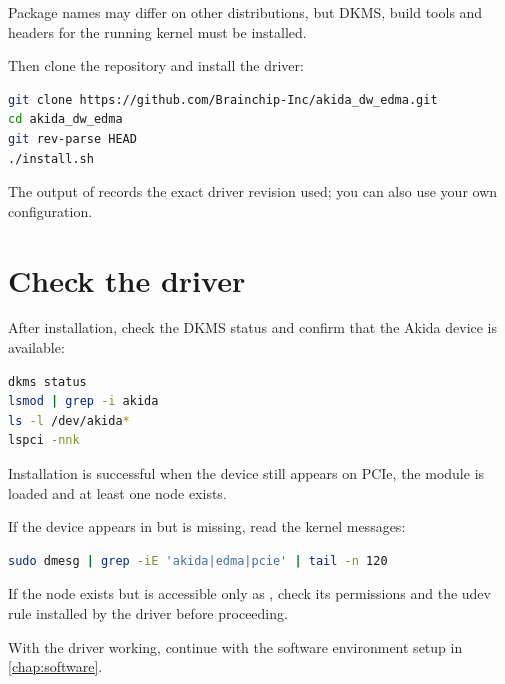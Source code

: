Package names may differ on other distributions, but DKMS, build tools and headers
for the running kernel must be installed.

Then clone the repository and install the driver:

\begin{lstlisting}[language=bash]
git clone https://github.com/Brainchip-Inc/akida_dw_edma.git
cd akida_dw_edma
git rev-parse HEAD
./install.sh
\end{lstlisting}

The output of  records the exact driver revision used;
you can also use your own configuration.

\section{Check the driver}

After installation, check the DKMS status and confirm that the Akida device is available:

\begin{lstlisting}[language=bash]
dkms status
lsmod | grep -i akida
ls -l /dev/akida*
lspci -nnk
\end{lstlisting}

Installation is successful when the device still appears on PCIe, the module is loaded
and at least one  node exists.

If the device appears in  but  is missing, read the
kernel messages:

\begin{lstlisting}[language=bash]
sudo dmesg | grep -iE 'akida|edma|pcie' | tail -n 120
\end{lstlisting}

If the node exists but is accessible only as , check its permissions and
the udev rule installed by the driver before proceeding.

With the driver working, continue with the software environment setup in
\cref{chap:software}.
